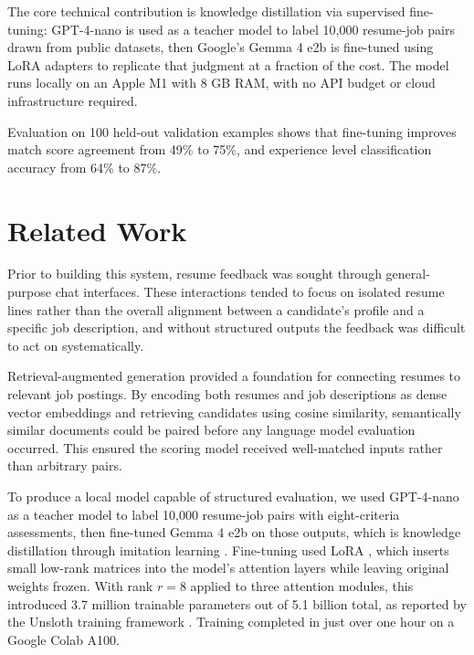 \documentclass[10pt,twocolumn,letterpaper]{article}
\begin{document}
The core technical contribution is knowledge distillation via supervised fine-tuning: GPT-4-nano is used as a teacher model to label 10,000 resume-job pairs drawn from public datasets, then Google's Gemma 4 e2b \cite{gemma4} is fine-tuned using LoRA adapters \cite{hu2022lora} to replicate that judgment at a fraction of the cost. The model runs locally on an Apple M1 with 8 GB RAM, with no API budget or cloud infrastructure required.

Evaluation on 100 held-out validation examples shows that fine-tuning improves match score agreement from 49\% to 75\%, and experience level classification accuracy from 64\% to 87\%.

\section{Related Work}

Prior to building this system, resume feedback was sought through general-purpose chat interfaces. These interactions tended to focus on isolated resume lines rather than the overall alignment between a candidate's profile and a specific job description, and without structured outputs the feedback was difficult to act on systematically.

Retrieval-augmented generation \cite{lewis2020rag} provided a foundation for connecting resumes to relevant job postings. By encoding both resumes and job descriptions as dense vector embeddings and retrieving candidates using cosine similarity, semantically similar documents could be paired before any language model evaluation occurred. This ensured the scoring model received well-matched inputs rather than arbitrary pairs.

To produce a local model capable of structured evaluation, we used GPT-4-nano as a teacher model to label 10,000 resume-job pairs with eight-criteria assessments, then fine-tuned Gemma 4 e2b on those outputs, which is knowledge distillation through imitation learning \cite{hinton2015distilling}. Fine-tuning used LoRA \cite{hu2022lora}, which inserts small low-rank matrices into the model's attention layers while leaving original weights frozen. With rank $r{=}8$ applied to three attention modules, this introduced 3.7 million trainable parameters out of 5.1 billion total, as reported by the Unsloth training framework \cite{unsloth}. Training completed in just over one hour on a Google Colab A100.

\end{document}
